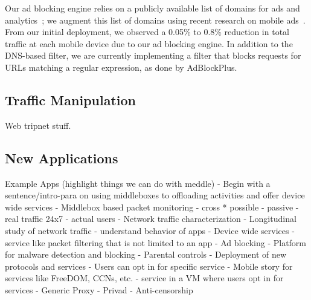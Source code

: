 
Our ad blocking engine relies on a publicly available list of domains for ads and
analytics~\cite{YoyoAds}; we augment this list of domains using 
recent research on mobile ads~\cite{hornyack:appfence,
  Leontiadis:2012:AdsMobile}. From our initial deployment, we observed a 0.05\% to 0.8\% reduction
in total traffic at each mobile device due to our ad blocking engine. 
In addition to the DNS-based filter, we are currently implementing a filter that blocks 
requests for URLs matching a regular expression, as done by AdBlockPlus.

\subsection{Traffic Manipulation}
Web tripnet stuff.

\subsection{New Applications}

Example Apps (highlight things we can do with meddle)
 - Begin with a sentence/intro-para on using middleboxes to offloading activities and offer device wide services
 - Middlebox based packet monitoring 
      - cross * possible
      - passive - real traffic 24x7 
      - actual users
      - Network traffic characterization
         - Longitudinal study of network traffic
         - understand behavior of apps
 - Device wide services - service like packet filtering that is not limited to an app 
     - Ad blocking
     - Platform for malware detection and blocking
     - Parental controls 
 - Deployment of new protocols and services 
   - Users can opt in for specific service
   - Mobile story for services like FreeDOM, CCNs, etc.
   - service in a VM where users opt in for services
 - Generic Proxy
   - Privad
   - Anti-censorship